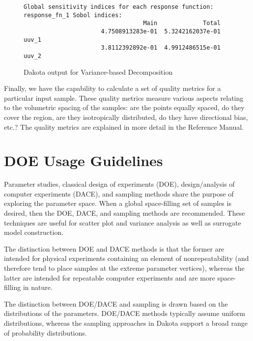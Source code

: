 \begin{figure}[ht!]
\centering
\begin{bigbox}
\begin{small}
\begin{verbatim}
Global sensitivity indices for each response function:
response_fn_1 Sobol indices:
                                  Main             Total
                      4.7508913283e-01  5.3242162037e-01 uuv_1
                      3.8112392892e-01  4.9912486515e-01 uuv_2
\end{verbatim}
\end{small}
\end{bigbox}
\caption{Dakota output for Variance-based Decomposition} 
\label{fig:dace:vbd}
\end{figure}

Finally, we have the capability to calculate a set of quality metrics 
for a particular input sample.  These quality metrics measure 
various aspects relating to the volumetric spacing of the samples: 
are the points equally spaced, do they cover the region, are they 
isotropically distributed, do they have directional bias, etc.? 
The quality metrics are explained in more detail in the Reference Manual.

\section{DOE Usage Guidelines}\label{dace:usage}

Parameter studies, classical design of experiments (DOE),
design/analysis of computer experiments (DACE), and sampling methods
share the purpose of exploring the parameter space.  When a global
space-filling set of samples is desired, then the DOE, DACE, and
sampling methods are recommended.  These techniques are useful for
scatter plot and variance analysis as well as surrogate model
construction. 

The distinction between DOE and DACE methods is that the
former are intended for physical experiments containing an element of
nonrepeatability (and therefore tend to place samples at the extreme
parameter vertices), whereas the latter are intended for repeatable
computer experiments and are more space-filling in nature. 

The distinction between DOE/DACE and sampling is drawn based on the
distributions of the parameters.  DOE/DACE methods typically assume
uniform distributions, whereas the sampling approaches in Dakota
support a broad range of probability distributions. 

